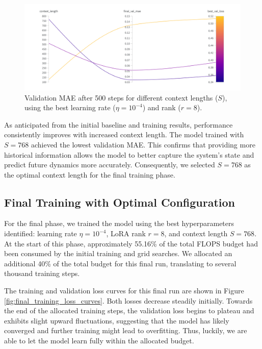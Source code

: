 \documentclass{article}
\begin{document}
\begin{figure}[!htbp] %
    \centering
    \includegraphics[width=0.75\linewidth]{M2 Course Work//Images/sweep_context_length_result.png}
    \caption{Validation MAE after 500 steps for different context lengths ($S$), using the best learning rate ($\eta=10^{-4}$) and rank ($r=8$).}
    \label{fig:context_search_results} %
\end{figure}

As anticipated from the initial baseline and training results, performance consistently improves with increased context length. The model trained with $S=768$ achieved the lowest validation MAE. This confirms that providing more historical information allows the model to better capture the system's state and predict future dynamics more accurately. Consequently, we selected $S=768$ as the optimal context length for the final training phase.

\subsection{Final Training with Optimal Configuration}

For the final phase, we trained the model using the best hyperparameters identified: learning rate $\eta=10^{-4}$, LoRA rank $r=8$, and context length $S=768$. At the start of this phase, approximately 55.16\% of the total FLOPS budget had been consumed by the initial training and grid searches. We allocated an additional 40\% of the total budget for this final run, translating to several thousand training steps.

The training and validation loss curves for this final run are shown in Figure \ref{fig:final_training_loss_curves}. Both losses decrease steadily initially. Towards the end of the allocated training steps, the validation loss begins to plateau and exhibits slight upward fluctuations, suggesting that the model has likely converged and further training might lead to overfitting. Thus, luckily, we are able to let the model learn fully within the allocated budget.
\end{document}
